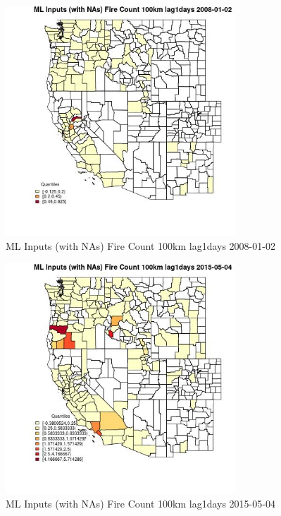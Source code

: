 \begin{figure} 
\centering  
\includegraphics[width=0.77\textwidth]{Code_Outputs/Report_ML_input_PM25_Step4_part_e_de_duplicated_aves_compiled_2019-05-18wNAs_CountyFire_Count_100km_lag1daysMean2008-01-02_2008-01-02.jpg} 
\caption{\label{fig:Report_ML_input_PM25_Step4_part_e_de_duplicated_aves_compiled_2019-05-18wNAsCountyFire_Count_100km_lag1daysMean2008-01-02_2008-01-02}ML Inputs (with NAs) Fire Count 100km lag1days 2008-01-02} 
\end{figure} 
 

\begin{figure} 
\centering  
\includegraphics[width=0.77\textwidth]{Code_Outputs/Report_ML_input_PM25_Step4_part_e_de_duplicated_aves_compiled_2019-05-18wNAs_CountyFire_Count_100km_lag1daysMean2015-05-04_2015-05-04.jpg} 
\caption{\label{fig:Report_ML_input_PM25_Step4_part_e_de_duplicated_aves_compiled_2019-05-18wNAsCountyFire_Count_100km_lag1daysMean2015-05-04_2015-05-04}ML Inputs (with NAs) Fire Count 100km lag1days 2015-05-04} 
\end{figure} 
 

